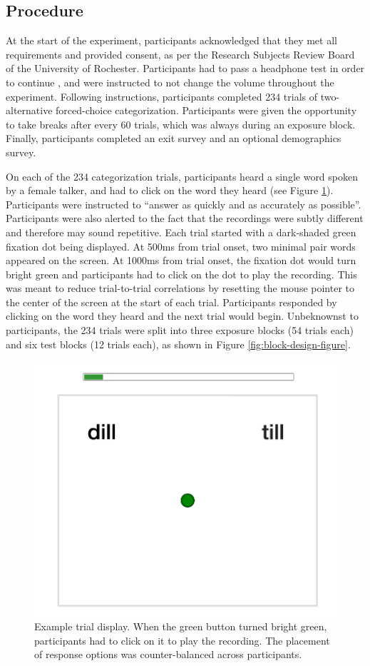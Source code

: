 \documentclass[
  11pt,
  man,mask,floatsintext]{apa6}
\begin{document}
\subsection{Procedure}\label{sec:procedure}

At the start of the experiment, participants acknowledged that they met all requirements and provided consent, as per the Research Subjects Review Board of the University of Rochester. Participants had to pass a headphone test in order to continue \autocite{woods2017}, and were instructed to not change the volume throughout the experiment. Following instructions, participants completed 234 trials of two-alternative forced-choice categorization. Participants were given the opportunity to take breaks after every 60 trials, which was always during an exposure block. Finally, participants completed an exit survey and an optional demographics survey.

On each of the 234 categorization trials, participants heard a single word spoken by a female talker, and had to click on the word they heard (see Figure \ref{fig:example-trial}). Participants were instructed to ``answer as quickly and as accurately as possible''. Participants were also alerted to the fact that the recordings were subtly different and therefore may sound repetitive. Each trial started with a dark-shaded green fixation dot being displayed. At 500ms from trial onset, two minimal pair words appeared on the screen. At 1000ms from trial onset, the fixation dot would turn bright green and participants had to click on the dot to play the recording. This was meant to reduce trial-to-trial correlations by resetting the mouse pointer to the center of the screen at the start of each trial. Participants responded by clicking on the word they heard and the next trial would begin. Unbeknownst to participants, the 234 trials were split into three exposure blocks (54 trials each) and six test blocks (12 trials each), as shown in Figure \ref{fig:block-design-figure}.

\begin{figure}

{\centering \includegraphics[width=0.33\linewidth]{../figures/trial_example} 

}

\caption{Example trial display. When the green button turned bright green, participants had to click on it to play the recording. The placement of response options was counter-balanced across participants.}\label{fig:example-trial}
\end{figure}
\end{document}
